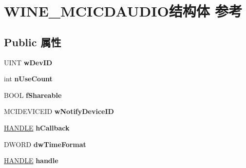 \hypertarget{struct_w_i_n_e___m_c_i_c_d_a_u_d_i_o}{}\section{W\+I\+N\+E\+\_\+\+M\+C\+I\+C\+D\+A\+U\+D\+I\+O结构体 参考}
\label{struct_w_i_n_e___m_c_i_c_d_a_u_d_i_o}
\subsection*{Public 属性}
\begin{DoxyCompactItemize}
\item 
\mbox{\label{struct_w_i_n_e___m_c_i_c_d_a_u_d_i_o_a0fc40ee71a4d1fdae79abd09ddca3f6a}} 
U\+I\+NT {\bfseries w\+Dev\+ID}
\item 
\mbox{\label{struct_w_i_n_e___m_c_i_c_d_a_u_d_i_o_a0af027b1df77d7ac1867170f14e2b2ac}} 
int {\bfseries n\+Use\+Count}
\item 
\mbox{\label{struct_w_i_n_e___m_c_i_c_d_a_u_d_i_o_acb8aafe47b7c06b5ea83fe4d144e838e}} 
B\+O\+OL {\bfseries f\+Shareable}
\item 
\mbox{\label{struct_w_i_n_e___m_c_i_c_d_a_u_d_i_o_a6a3433f5ca73a251c1d685572757c9d8}} 
M\+C\+I\+D\+E\+V\+I\+C\+E\+ID {\bfseries w\+Notify\+Device\+ID}
\item 
\mbox{\label{struct_w_i_n_e___m_c_i_c_d_a_u_d_i_o_a749db227f9753faec06c22b7c62f2152}} 
\hyperlink{interfacevoid}{H\+A\+N\+D\+LE} {\bfseries h\+Callback}
\item 
\mbox{\label{struct_w_i_n_e___m_c_i_c_d_a_u_d_i_o_ae219cbfe99fa5126efe3410e68ccb6e3}} 
D\+W\+O\+RD {\bfseries dw\+Time\+Format}
\item 
\mbox{\label{struct_w_i_n_e___m_c_i_c_d_a_u_d_i_o_a00df835e73eb114cc05448782be36da3}} 
\hyperlink{interfacevoid}{H\+A\+N\+D\+LE} {\bfseries handle}
\item 
\mbox{\label{struct_w_i_n_e___m_c_i_c_d_a_u_d_i_o_a7d52123c7a2e1e47d58b4350a21cdbeb}} 

\end{DoxyCompactItemize}
